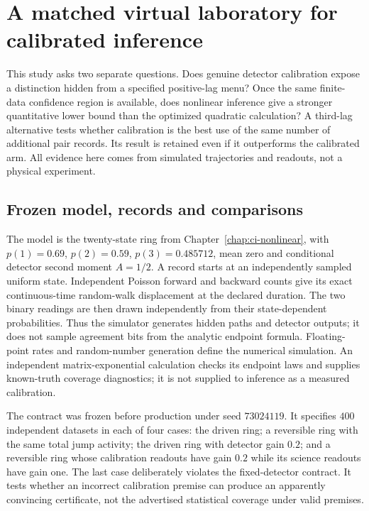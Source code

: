 \chapter{A matched virtual laboratory for calibrated inference}
\label{chap:ci-calibrated-benchmark}

This study asks two separate questions. Does genuine detector calibration
expose a distinction hidden from a specified positive-lag menu? Once the same
finite-data confidence region is available, does nonlinear inference give a
stronger quantitative lower bound than the optimized quadratic calculation?
A third-lag alternative tests whether calibration is the best use of the same
number of additional pair records. Its result is retained even if it outperforms
the calibrated arm. All evidence here comes from simulated trajectories and
readouts, not a physical experiment.

\section{Frozen model, records and comparisons}
The model is the twenty-state ring from Chapter~\ref{chap:ci-nonlinear}, with
$p(1)=0.69$, $p(2)=0.59$, $p(3)=0.485712$, mean zero and conditional detector
second moment $A=1/2$. A record starts at an independently sampled uniform
state. Independent Poisson forward and backward counts give its exact
continuous-time random-walk displacement at the declared duration. The two
binary readings are then drawn independently from their state-dependent
probabilities. Thus the simulator generates hidden paths and detector outputs;
it does not sample agreement bits from the analytic endpoint formula.
Floating-point rates and random-number generation define the numerical
simulation. An independent matrix-exponential calculation checks its endpoint
laws and supplies known-truth coverage diagnostics; it is not supplied to
inference as a measured calibration.

The contract was frozen before production under seed $73024119$. It specifies
$400$ independent datasets in each of four cases: the driven ring; a reversible
ring with the same total jump activity; the driven ring with detector gain
$0.2$; and a reversible ring whose calibration readouts have gain $0.2$ while
its science readouts have gain one. The last case deliberately violates the
fixed-detector contract. It tests whether an incorrect calibration premise can
produce an apparently convincing certificate, not the advertised statistical
coverage under valid premises.

